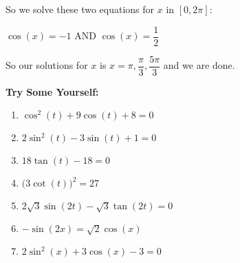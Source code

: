 \documentclass[12pt]{article}
\begin{document}
So we solve these two equations for $x$ in $[0, 2\pi]$:
\newline

\centerline{$\cos(x) = -1$\hspace{1cm} AND \hspace{1cm} $\cos(x) = \dfrac{1}{2}$}

So our solutions for $x$ is $x = \pi, \dfrac{\pi}{3}, \dfrac{5\pi}{3}$ and we are done.

\textbf{Try Some Yourself:}

\begin{enumerate}
\item $\cos^{2}(t) + 9\cos(t) + 8 = 0$
\item $2\sin^{2}(t) - 3\sin(t) + 1 = 0$
\item $18\tan(t) - 18 = 0$
\item $\Big(3\cot(t)\Big)^{2} = 27$
\item $2\sqrt{3}\sin(2t) - \sqrt{3}\tan(2t) = 0$
\item $-\sin(2x) = \sqrt{2}\cos(x)$
\item $2\sin^{2}(x) + 3\cos(x) - 3=0$
\end{enumerate}
\end{document}
